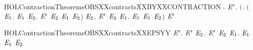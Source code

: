 \newcommand{\HOLContractionTheoremsOBSXXcontractsXXANDXXTRACEXXtau}{\UseVerbatim{HOLContractionTheoremsOBSXXcontractsXXANDXXTRACEXXtau}}
\begin{SaveVerbatim}{HOLContractionTheoremsOBSXXcontractsXXBYXXCONTRACTION}
\HOLTokenTurnstile{} \HOLSymConst{\HOLTokenForall{}}.
       \HOLSymConst{\HOLTokenImp{}}
     \HOLSymConst{\HOLTokenForall{}} \ensuremath{\HOLBoundVar{E}\sp{\prime{}}}.
       \ensuremath{(}\HOLSymConst{\HOLTokenForall{}}. \ensuremath{(}\HOLSymConst{\HOLTokenForall{}}\ensuremath{\HOLBoundVar{E}\sb{\mathrm{1}}}.  \HOLTokenTransBegin{}\HOLTokenTransEnd \ensuremath{\HOLBoundVar{E}\sb{\mathrm{1}}} \HOLSymConst{\HOLTokenImp{}} \HOLSymConst{\HOLTokenExists{}}\ensuremath{\HOLBoundVar{E}\sb{\mathrm{2}}}. \ensuremath{\HOLBoundVar{E}\sp{\prime{}}} \HOLTokenTransBegin{}\HOLTokenTransEnd \ensuremath{\HOLBoundVar{E}\sb{\mathrm{2}}} \HOLSymConst{\HOLTokenConj{}}  \ensuremath{\HOLBoundVar{E}\sb{\mathrm{1}}} \ensuremath{\HOLBoundVar{E}\sb{\mathrm{2}}}\ensuremath{)} \HOLSymConst{\HOLTokenConj{}}
            \HOLSymConst{\HOLTokenForall{}}\ensuremath{\HOLBoundVar{E}\sb{\mathrm{2}}}. \ensuremath{\HOLBoundVar{E}\sp{\prime{}}} \HOLTokenTransBegin{}\HOLTokenTransEnd \ensuremath{\HOLBoundVar{E}\sb{\mathrm{2}}} \HOLSymConst{\HOLTokenImp{}} \HOLSymConst{\HOLTokenExists{}}\ensuremath{\HOLBoundVar{E}\sb{\mathrm{1}}}.  \HOLTokenWeakTransBegin{}\HOLTokenWeakTransEnd \ensuremath{\HOLBoundVar{E}\sb{\mathrm{1}}} \HOLSymConst{\HOLTokenConj{}}  \ensuremath{\HOLBoundVar{E}\sb{\mathrm{1}}} \ensuremath{\HOLBoundVar{E}\sb{\mathrm{2}}}\ensuremath{)} \HOLSymConst{\HOLTokenImp{}}
         \ensuremath{\HOLBoundVar{E}\sp{\prime{}}}
\end{SaveVerbatim}
\newcommand{\HOLContractionTheoremsOBSXXcontractsXXBYXXCONTRACTION}{\UseVerbatim{HOLContractionTheoremsOBSXXcontractsXXBYXXCONTRACTION}}
\begin{SaveVerbatim}{HOLContractionTheoremsOBSXXcontractsXXEPSYY}
\HOLTokenTurnstile{} \HOLSymConst{\HOLTokenForall{}} \ensuremath{\HOLBoundVar{E}\sp{\prime{}}}.
       \ensuremath{\HOLBoundVar{E}\sp{\prime{}}} \HOLSymConst{\HOLTokenImp{}}
     \HOLSymConst{\HOLTokenForall{}}\ensuremath{\HOLBoundVar{E}\sb{\mathrm{2}}}.  \ensuremath{\HOLBoundVar{E}\sp{\prime{}}} \ensuremath{\HOLBoundVar{E}\sb{\mathrm{2}}} \HOLSymConst{\HOLTokenImp{}} \HOLSymConst{\HOLTokenExists{}}\ensuremath{\HOLBoundVar{E}\sb{\mathrm{1}}}.   \ensuremath{\HOLBoundVar{E}\sb{\mathrm{1}}} \HOLSymConst{\HOLTokenConj{}}  \ensuremath{\HOLBoundVar{E}\sb{\mathrm{1}}} \ensuremath{\HOLBoundVar{E}\sb{\mathrm{2}}}
\end{SaveVerbatim}
